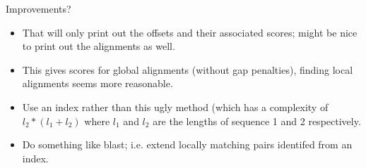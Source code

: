 \documentclass[pdf]{beamer}
\begin{document}
\begin{frame}[fragile]{Improvements?}
  \begin{itemize}
  \item That will only print out the offsets and their associated scores;
    might be nice to print out the alignments as well.
  \item This gives scores for global alignments (without gap penalties),
    finding local alignments seems more reasonable.
  \item Use an index rather than this ugly method (which has a complexity of
    $l_2 * (l_1 + l_2)$ where $l_1$ and $l_2$ are the lengths of sequence
    1 and 2 respectively.
  \item Do something like blast; i.e. extend locally matching pairs identifed
    from an index.
  \end{itemize}
\end{frame}
\end{document}
